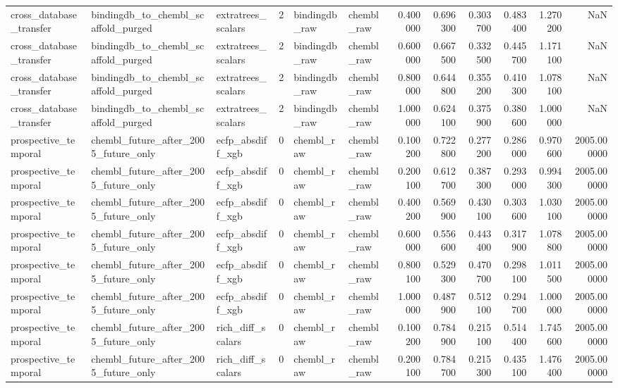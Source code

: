 \begin{longtable}{lllrllrrrrrr}
cross\_database\_transfer & bindingdb\_to\_chembl\_scaffold\_purged & extratrees\_scalars & 2 & bindingdb\_raw & chembl\_raw & 0.400000 & 0.696300 & 0.303700 & 0.483400 & 1.270200 & NaN \\
cross\_database\_transfer & bindingdb\_to\_chembl\_scaffold\_purged & extratrees\_scalars & 2 & bindingdb\_raw & chembl\_raw & 0.600000 & 0.667500 & 0.332500 & 0.445700 & 1.171100 & NaN \\
cross\_database\_transfer & bindingdb\_to\_chembl\_scaffold\_purged & extratrees\_scalars & 2 & bindingdb\_raw & chembl\_raw & 0.800000 & 0.644800 & 0.355200 & 0.410300 & 1.078100 & NaN \\
cross\_database\_transfer & bindingdb\_to\_chembl\_scaffold\_purged & extratrees\_scalars & 2 & bindingdb\_raw & chembl\_raw & 1.000000 & 0.624100 & 0.375900 & 0.380600 & 1.000000 & NaN \\
prospective\_temporal & chembl\_future\_after\_2005\_future\_only & ecfp\_absdiff\_xgb & 0 & chembl\_raw & chembl\_raw & 0.100200 & 0.722800 & 0.277200 & 0.286000 & 0.970600 & 2005.000000 \\
prospective\_temporal & chembl\_future\_after\_2005\_future\_only & ecfp\_absdiff\_xgb & 0 & chembl\_raw & chembl\_raw & 0.200100 & 0.612700 & 0.387300 & 0.293000 & 0.994300 & 2005.000000 \\
prospective\_temporal & chembl\_future\_after\_2005\_future\_only & ecfp\_absdiff\_xgb & 0 & chembl\_raw & chembl\_raw & 0.400200 & 0.569900 & 0.430100 & 0.303600 & 1.030100 & 2005.000000 \\
prospective\_temporal & chembl\_future\_after\_2005\_future\_only & ecfp\_absdiff\_xgb & 0 & chembl\_raw & chembl\_raw & 0.600000 & 0.556600 & 0.443400 & 0.317900 & 1.078800 & 2005.000000 \\
prospective\_temporal & chembl\_future\_after\_2005\_future\_only & ecfp\_absdiff\_xgb & 0 & chembl\_raw & chembl\_raw & 0.800100 & 0.529300 & 0.470700 & 0.298100 & 1.011500 & 2005.000000 \\
prospective\_temporal & chembl\_future\_after\_2005\_future\_only & ecfp\_absdiff\_xgb & 0 & chembl\_raw & chembl\_raw & 1.000000 & 0.487900 & 0.512100 & 0.294700 & 1.000000 & 2005.000000 \\
prospective\_temporal & chembl\_future\_after\_2005\_future\_only & rich\_diff\_scalars & 0 & chembl\_raw & chembl\_raw & 0.100200 & 0.784900 & 0.215100 & 0.514400 & 1.745600 & 2005.000000 \\
prospective\_temporal & chembl\_future\_after\_2005\_future\_only & rich\_diff\_scalars & 0 & chembl\_raw & chembl\_raw & 0.200100 & 0.784700 & 0.215300 & 0.435100 & 1.476400 & 2005.000000 \\

\end{longtable}
